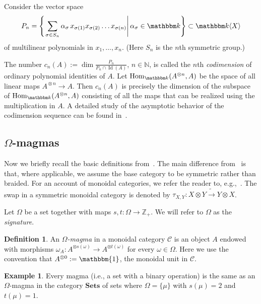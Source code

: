 \documentclass[12pt, reqno, a4paper]{amsart}
\theoremstyle{plain}
\theoremstyle{remark}
\theoremstyle{definition}
\newtheorem{example}[theorem]{Example}
\newtheorem{definition}[theorem]{Definition}
\numberwithin{equation}{section}
\DeclareMathOperator{\Id}{Id}
\DeclareMathOperator{\Hom}{Hom}
\begin{document}
Consider the vector space $$P_n = \left\lbrace  \left.\sum\limits_{\sigma \in S_n} \alpha_\sigma\, 
x_{\sigma(1)} x_{\sigma(2)} \ldots x_{\sigma(n)} \right| \alpha_\sigma \in \mathbbm k \right\rbrace \subset \mathbbm k \langle X \rangle$$ of multilinear polynomials in $x_1, \ldots, x_n$.
(Here $S_n$ is the $n$th symmetric group.)

The number $c_n(A) := \dim \frac{P_n}{P_n \cap \Id(A)}$, $n\in\mathbb N$, is called the $n$th \textit{codimension}
of ordinary polynomial identities of $A$. Let  $\Hom_{\mathbbm k}(A^{{}\otimes n},A)$ be the space of all linear maps $A^{{}\otimes n} \to A$. Then $c_n(A)$ is precisely the dimension of the subspace of $\Hom_{\mathbbm k}(A^{{}\otimes n},A)$ consisting of all the maps that can be realized using the multiplication in $A$. A detailed study of the asymptotic behavior of the codimension sequence can be found in~\cite{GiaZai}.

\subsection{$\Omega$-magmas} Now we briefly recall the basic definitions from~\cite{ASGordienko23}. The main difference from~\cite{ASGordienko23}
is that, where applicable, we assume the base category to be symmetric rather than braided. 
For an account of monoidal categories,
we refer the reader to,  e.g.,~\cite{EGNObook}. The swap in a symmetric monoidal category is denoted by $\tau_{X,Y} \colon X \otimes Y \mathrel{\widetilde\to} Y \otimes X$.

Let $\Omega$ be a set together with maps $s,t \colon \Omega \to \mathbb Z_+$. We will refer to $\Omega$ as the \textit{signature}. 

\begin{definition} An \textit{$\Omega$-magma} in a monoidal category $\mathcal C$ is 
	an object $A$ endowed with morphisms $\omega_A \colon A^{\otimes s(\omega)} \to
	A^{\otimes t(\omega)}$ for every $\omega \in \Omega$. Here we use the convention that $A^{\otimes 0} := \mathbbm{1}$, the monoidal unit in $\mathcal C$.
\end{definition}

\begin{example}\label{ExampleMagma}
	Every magma (i.e., a set with a binary operation) is the same as an $\Omega$-magma in the category $\mathbf{Sets}$ of sets where $\Omega=\lbrace\mu \rbrace$ with $s(\mu)=2$ and $t(\mu)=1$.
\end{example}
\end{document}
